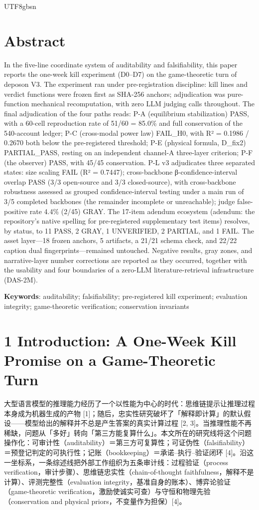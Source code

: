 \documentclass[10pt,a4paper]{article}
\begin{document}
\begin{CJK}{UTF8}{gbsn}
\section*{Abstract}In the five-line coordinate system of auditability and falsifiability, this paper reports the one-week kill experiment (D0–D7) on the game-theoretic turn of deposon V3. The experiment ran under pre-registration discipline: kill lines and verdict functions were frozen first as SHA-256 anchors; adjudication was pure-function mechanical recomputation, with zero LLM judging calls throughout. The final adjudication of the four paths reads: P-A (equilibrium stabilization) PASS, with a 60-cell reproduction rate of 51/60 = 85.0\% and full conservation of the 540-account ledger; P-C (cross-modal power law) FAIL\_H0, with R² = 0.1986 / 0.2670 both below the pre-registered threshold; P-E (physical formula, D\_fix2) PARTIAL\_PASS, resting on an independent channel-A three-layer criterion; P-F (the observer) PASS, with 45/45 conservation. P-L v3 adjudicates three separated states: size scaling FAIL (R² = 0.7447); cross-backbone β-confidence-interval overlap PASS (3/3 open-source and 3/3 closed-source), with cross-backbone robustness assessed as grouped confidence-interval testing under a main run of 3/5 completed backbones (the remainder incomplete or unreachable); judge false-positive rate 4.4\% (2/45) GRAY. The 17-item adendum ecosystem (adendum: the repository's native spelling for pre-registered supplementary test items) resolves, by status, to 11 PASS, 2 GRAY, 1 UNVERIFIED, 2 PARTIAL, and 1 FAIL. The asset layer—18 frozen anchors, 5 artifacts, a 21/21 schema check, and 22/22 caption dual fingerprints—remained untouched. Negative results, gray zones, and narrative-layer number corrections are reported as they occurred, together with the usability and four boundaries of a zero-LLM literature-retrieval infrastructure (DAS-2M).

\noindent \textbf{Keywords}: auditability; falsifiability; pre-registered kill experiment; evaluation integrity; game-theoretic verification; conservation invariants


\section*{1 Introduction: A One-Week Kill Promise on a Game-Theoretic Turn}大型语言模型的推理能力经历了一个以性能为中心的时代：思维链提示让推理过程本身成为机器生成的产物 [1]；随后，忠实性研究破坏了「解释即计算」的默认假设——模型给出的解释并不总是产生答案的真实计算过程 [2, 3]。当推理性能不再稀缺，问题从「多好」转向「第三方能复算什么」。本文所在的研究线将这个问题操作化：可审计性（auditability）＝第三方可复算性；可证伪性（falsifiability）＝预登记判定的可执行性；记账（bookkeeping）＝承诺–执行–验证闭环 [4]。沿这一坐标系，一条综述线把外部工作组织为五条审计线：过程验证（process verification，审计步骤）、思维链忠实性（chain-of-thought faithfulness，解释不是计算）、评测完整性（evaluation integrity，基准自身的账本）、博弈论验证（game-theoretic verification，激励使诚实可查）与守恒和物理先验（conservation and physical priors，不变量作为担保）[4]。


\end{CJK}
\end{document}
